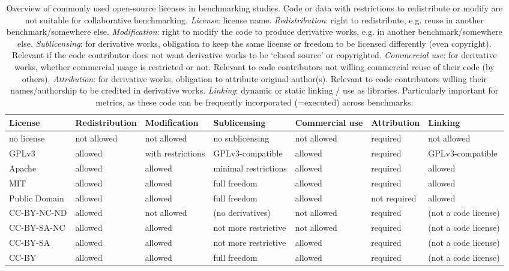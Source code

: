 \documentclass[11pt]{article}
\begin{document}
\begin{table}[]
    \caption[Overview of commonly-used open-source licenses in benchmarking studies.]{Overview of commonly used open-source licenses in benchmarking studies. Code or data with restrictions to redistribute or modify are not suitable for collaborative benchmarking. \emph{License}: license name. \emph{Redistribution}: right to redistribute, e.g. reuse in another benchmark/somewhere else. \emph{Modification}: right to modify the code to produce derivative works, e.g. in another benchmark/somewhere else. \emph{Sublicensing}: for derivative works, obligation to keep the same license or freedom to be licensed differently (even copyright). Relevant if the code contributor does not want derivative works to be `closed source' or copyrighted. \emph{Commercial use}: for derivative works, whether commercial usage is restricted or not. Relevant to code contributors not willing commercial reuse of their code (by others). \emph{Attribution}: for derivative works, obligation to attribute original author(s). Relevant to code contributors willing their names/authorship to be credited in derivative works. \emph{Linking}: dynamic or static linking / use as libraries. Particularly important for metrics, as these code can be frequently incorporated (=executed) across benchmarks. }
    \vspace{0.5cm}
    \centering
    \begin{adjustbox}{max width=\textwidth}
    \begin{tabular}{|l|l|l|l|l|l|l|}
    \hline
    License       &  Redistribution       &   Modification   & Sublicensing  & Commercial use & Attribution    & Linking   \\ \hline
    no license	& not allowed	& not allowed	& no sublicensing	& not allowed	& required	& not allowed	 \\
    GPLv3 &   	allowed	 & with restrictions	& GPLv3-compatible	& allowed	& required	& GPLv3-compatible \\
    Apache &	allowed &	allowed	& minimal restrictions	& allowed	& required	& allowed \\
    MIT	& allowed	& allowed	& full freedom	& allowed	& required	& allowed	 \\
    Public Domain	& allowed	& allowed	& full freedom	& allowed	& not required	& allowed  \\
    \textsc{CC-BY-NC-ND}	& allowed	& not allowed&	(no derivatives)	& not allowed	& required &	(not a code license)	 \\
    \textsc{CC-BY-SA-NC}	& allowed	& allowed	& not more restrictive& 	not allowed &	required	& (not a code license)	 \\
    \textsc{CC-BY-SA}	& allowed	& allowed	& not more restrictive &	allowed	& required&	(not a code license)  \\
    \textsc{CC-BY} &	allowed	& allowed	& full freedom 	& allowed& 	required&	(not a code license) \\ \hline

    \end{tabular}
    \end{adjustbox}
    \label{tab:licenses}
\end{table}
\end{document}
